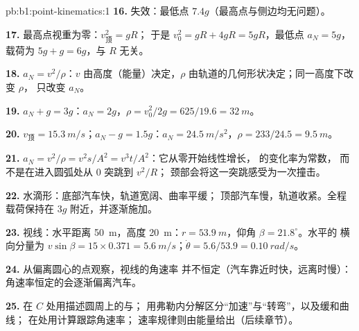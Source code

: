 \begin{solution}{pb:b1:point-kinematics:1}
\textbf{16.} 失效：最低点 $7.4g$（最高点与侧边均无问题）。

\textbf{17.} 最高点视重为零：$v_{\text{顶}}^2 = gR$；
于是 $v_0^2 = gR + 4gR = 5gR$，最低点 $a_N = 5g$，载荷为
$5g + g = 6g$，与 $R$ 无关。

\textbf{18.} $a_N = v^2/\rho$：$v$ 由高度（能量）决定，$\rho$
由轨道的几何形状决定；同一高度下改变 $\rho$，
只改变 $a_N$。

\textbf{19.} $a_N + g = 3g$：$a_N = 2g$，$\rho = v_0^2/2g = 625/19.6 =
\qty{32}{m}$。

\textbf{20.} $v_{\text{顶}} = \qty{15.3}{m/s}$；$a_N - g = 1.5g$：$a_N =
\qty{24.5}{m/s^2}$，$\rho = 233/24.5 = \qty{9.5}{m}$。

\textbf{21.} $a_N = v^2/\rho = v^2s/A^2 = v^3t/A^2$：它从零开始线性增长，
的变化率为常数，
而不是在进入圆弧处从 $0$ 突跳到 $v^2/R$；
颈部会将这一突跳感受为一次撞击。

\textbf{22.} 水滴形：底部汽车快，轨道宽阔、曲率平缓；
顶部汽车慢，轨道收紧。全程载荷保持在
$3g$ 附近，并逐渐施加。

\textbf{23.} 视线：水平距离 \qty{50}{m}，高度
\qty{20}{m}：$r = \qty{53.9}{m}$，仰角 $\beta = 21.8^\circ$。水平的
横向分量为 $v\sin\beta = 15 \times
0.371 = \qty{5.6}{m/s}$；$\dot\theta = 5.6/53.9 = \qty{0.10}{rad/s}$。

\textbf{24.} 从偏离圆心的点观察，视线的角速率
并不恒定（汽车靠近时快，远离时慢）：
角速率恒定的会逐渐偏离汽车。

\textbf{25.} 在 $C$ 处用描述圆周上的与；
用弗勒内分解区分“加速”与“转弯”，以及缓和曲线；
在处用计算跟踪角速率；
速率规律则由能量给出（后续章节）。
\end{solution}
